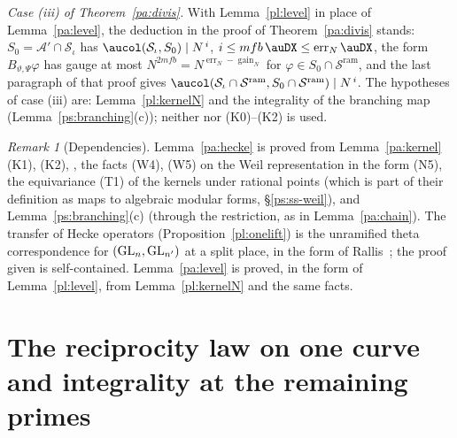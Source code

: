\documentclass[10pt]{amsart}
\theoremstyle{definition}
\theoremstyle{remark}
\newtheorem{remark}[theorem]{Remark}
\providecommand{\auNm}{\operatorname{Nm}}
\providecommand{\auO}{\mathcal O}
\providecommand{\auPl}{\Phi}
\providecommand{\auS}{\mathcal S}
\providecommand{\auSram}{\mathcal S^{\mathrm{ram}}}
\providecommand{\auU}{\mathrm U}
\providecommand{\aubar}[1]{\overline{#1}}
\providecommand{\auerr}{\operatorname{err}}
\providecommand{\augain}{\operatorname{gain}}
\begin{document}
\emph{Case (iii) of Theorem~\ref{pa:divis}.} With Lemma~\ref{pl:level} in place of
Lemma~\ref{pa:level}, the deduction in the proof of Theorem~\ref{pa:divis} stands: $S_0=\mathcal A'
\cap\auS_\iota$ has $\aucol(\auS_\iota,S_0)\mid N^{\,i}$, $i\le mfb\,\auDX\le\auerr_N\auDX$, the
form $B_{\vartheta,\Psi}\varphi$ has gauge at most $N^{2mfb}=N^{\auerr_N-\augain_N}$ for
$\varphi\in S_0\cap\auSram$, and the last paragraph of that proof gives $\aucol(\auS_\iota\cap
\auSram,S_0\cap\auSram)\mid N^{\,i}$. The hypotheses of case (iii) are: Lemma~\ref{pl:kernelN} and
the integrality of the branching map (Lemma~\ref{ps:branching}(c)); neither
{\cite[Proposition~14.25]{P46}} nor (K0)--(K2) is used.

\begin{remark}[Dependencies]\label{pl:status}
Lemma~\ref{pa:hecke} is proved from Lemma~\ref{pa:kernel} (K1), (K2),
{\cite[Proposition~14.25]{P46}}, the facts (W4), (W5) on the Weil representation in the form (N5),
the equivariance (T1) of the kernels under rational points (which is part of their definition as
maps to algebraic modular forms, \S\ref{ps:ss-weil}), and Lemma~\ref{ps:branching}(c) (through the
restriction, as in Lemma~\ref{pa:chain}). The transfer
of Hecke operators (Proposition~\ref{pl:onelift}) is the unramified theta correspondence for
$(\auGL_n,\auGL_{n'})$ at a split place, in the form of Rallis~\cite{RallisFunctoriality}; the
proof given is self-contained. Lemma~\ref{pa:level} is proved, in the form of
Lemma~\ref{pl:level}, from Lemma~\ref{pl:kernelN} and the same facts.
\end{remark}



\providecommand{\auO}{\mathcal O}
\providecommand{\auU}{\mathrm U}
\providecommand{\auGL}{\mathrm{GL}}
\providecommand{\auHom}{\operatorname{Hom}}
\providecommand{\auA}{\mathbb A}
\providecommand{\auF}{\mathbb F}
\providecommand{\auPl}{\Phi}
\providecommand{\auS}{\mathcal S}
\providecommand{\auNm}{\operatorname{Nm}}
\providecommand{\auAut}{\operatorname{Aut}}
\providecommand{\aubar}[1]{\overline{#1}}
\providecommand{\psM}{\mathsf M}
\providecommand{\psHS}{\mathcal H}
\providecommand{\psZ}{Z}
\providecommand{\psvac}{\mathbf v}
\providecommand{\psrho}{\varrho}
\providecommand{\pao}{\mathfrak o}
\providecommand{\pam}{\mathfrak m}
\providecommand{\pktr}{\operatorname{tr}}
\providecommand{\pfT}{\operatorname{Tr}}
\providecommand{\pfv}{\operatorname{ord}}
\providecommand{\pfbr}[1]{\theta[#1]}

\section{The reciprocity law on one curve and integrality at the remaining primes}\label{pf:sec}
\end{document}
